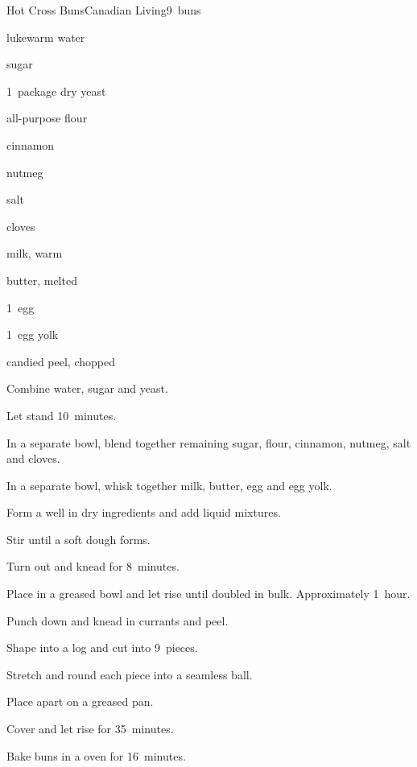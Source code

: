 \begin{recipe}{Hot Cross Buns}{Canadian Living}{9~buns}

\begin{ingredients}
\item \C{\quarter} lukewarm water
\item \C{\half} sugar
\item 1~package dry yeast
\item \C{3\half} all-purpose flour
\item {} cinnamon
\item {} nutmeg
\item \tp{\half} salt
\item \tp{\quarter} cloves
\item \C{\threequarter} milk, warm
\item \C{\quarter} butter, melted
\item 1~egg
\item 1~egg yolk
\item \C{\half} 
\item \C{\quarter} candied peel, chopped
\end{ingredients}

\begin{directions}
\item Combine water,  sugar and yeast.
\item Let stand 10~minutes.
\item In a separate bowl, blend together remaining sugar, flour, cinnamon, nutmeg, salt and cloves.
\item In a separate bowl, whisk together milk, butter, egg and egg yolk.
\item Form a well in dry ingredients and add liquid mixtures.
\item Stir until a soft dough forms.
\item Turn out and knead for 8~minutes.
\item Place in a greased bowl and let rise until doubled in bulk. Approximately 1~hour.
\item Punch down and knead in currants and peel.
\item Shape into a  log and cut into 9~pieces.
\item Stretch and round each piece into a seamless ball.
\item Place  apart on a greased pan.
\item Cover and let rise for 35~minutes.
\item Bake buns in a  oven for 16~minutes.
\end{directions}


\end{recipe}

